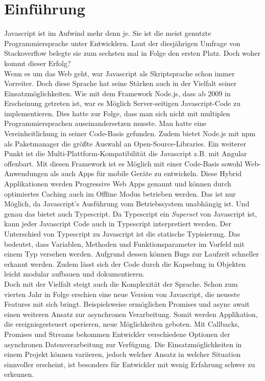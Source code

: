 \setcounter{secnumdepth}{1}

\section{Einführung}

Javascript ist im Aufwind mehr denn je. Sie ist die meist genutzte Programmiersprache unter Entwicklern. Laut der diesjährigen Umfrage von Stackoverflow belegte sie zum sechsten mal in Folge den ersten Platz\cite{programming-language-survey}. Doch woher kommt dieser Erfolg? \\

\noindent
Wenn es um das Web geht, war Javascript als Skriptsprache schon immer Vorreiter. Doch diese Sprache hat seine Stärken auch in der Vielfalt seiner Einsatzmöglichkeiten. Wie mit dem Framework Node.js, dass ab 2009 in Erscheinung getreten ist, war es Möglich Server-seitigen Javascript-Code zu implementieren. Dies hatte zur Folge, dass man sich nicht mit multiplen Programmiersprachen auseinandersetzen musste. Man hatte eine Vereinheitlichung in seiner Code-Basis gefunden. Zudem bietet Node.js mit npm als Paketmanager die größte Auswahl an Open-Source-Libraries. Ein weiterer Punkt ist die Multi-Plattform-Kompatibilität die Javascript z.B. mit Angular offenbart. Mit diesen Framework ist es Möglich mit einer Code-Basis sowohl Web-Anwendungen als auch Apps für mobile Geräte zu entwickeln. Diese Hybrid Applikationen werden Progressive Web Apps genannt und können durch optimiertes Caching auch im Offline Modus betrieben werden. Das ist nur Möglich, da Javascript's Ausführung vom Betriebssystem unabhängig ist. Und genau das bietet auch Typescript. Da Typescript ein \textit{Superset} von Javascript ist, kann jeder Javascript Code auch in Typescript interpretiert werden. Der Unterschied von Typescript zu Javascript ist die statische Typisierung. Das bedeutet, dass Variablen, Methoden und Funktionsparameter im Vorfeld mit einem Typ versehen werden. Aufgrund dessen können Bugs zur Laufzeit schneller erkannt werden. Zudem lässt sich der Code durch die Kapselung in Objekten leicht modular aufbauen und dokumentieren.\\

\noindent
Doch mit der Vielfalt steigt auch die Komplexität der Sprache. Schon zum vierten Jahr in Folge erschien eine neue Version von Javascript, die neueste Features mit sich bringt. Beispielsweise ermöglichen Promises und async await einen weiteren Ansatz zur asynchronen Verarbeitung. Somit werden Applikation, die ereignisgesteuert operieren, neue Möglichkeiten geboten. Mit Callbacks, Promises und Streams bekommen Entwickler verschiedene Optionen der asynchronen Datenverarbeitung zur Verfügung. Die Einsatzmöglichkeiten in einem Projekt können variieren, jedoch welcher Ansatz in welcher Situation sinnvoller erscheint, ist besonders für Entwickler mit wenig Erfahrung schwer zu erkennen.

